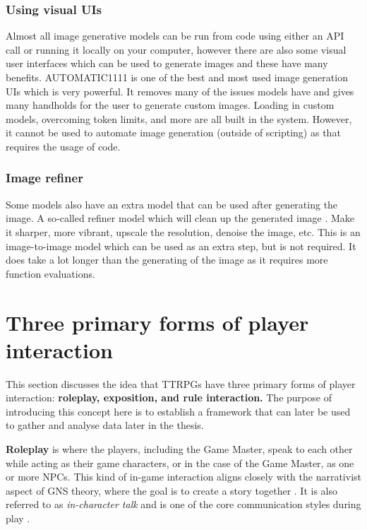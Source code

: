 \subsubsection*{Using visual UIs}
Almost all image generative models can be run from code using either an API call or running it locally on your computer, however there are also some visual user interfaces which can be used to generate images and these have many benefits. AUTOMATIC1111 is one of the best and most used image generation UIs which is very powerful. It removes many of the issues models have and gives many handholds for the user to generate custom images. Loading in custom models, overcoming token limits, and more are all built in the system. However, it cannot be used to automate image generation (outside of scripting) as that requires the usage of code.
\subsubsection*{Image refiner}
Some models also have an extra model that can be used after generating the image. A so-called refiner model which will clean up the generated image \cite{stabilityai_sdxl_refiner_1.0}. Make it sharper, more vibrant, upscale the resolution, denoise the image, etc. This is an image-to-image model which can be used as an extra step, but is not required. It does take a lot longer than the generating of the image as it requires more function evaluations.

\section{Three primary forms of player interaction} \label{sec:2.6}
This section discusses the idea that TTRPGs have three primary forms of player interaction: \textbf{roleplay, exposition, and rule interaction.} The purpose of introducing this concept here is to establish a framework that can later be used to gather and analyse data later in the thesis.

\textbf{Roleplay} is where the players, including the Game Master, speak to each other while acting as their game characters, or in the case of the Game Master, as one or more NPCs. This kind of in-game interaction aligns closely with the narrativist aspect of GNS theory, where the goal is to create a story together \cite{edwards2001gns}. It is also referred to as \textit{in-character talk} and is one of the core communication styles during play \cite{bowman2010social, fine1983shared}.

